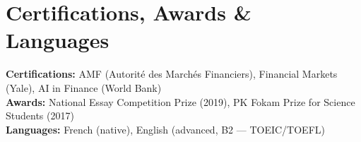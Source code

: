 \section{Certifications, Awards \& Languages}
\begin{itemize}[leftmargin=0.15in, label={}]
  \small{\item{
    \textbf{Certifications:} AMF (Autorit\'e des March\'es Financiers), Financial Markets (Yale), AI in Finance (World Bank) \\
    \textbf{Awards:} National Essay Competition Prize (2019), PK Fokam Prize for Science Students (2017) \\
    \textbf{Languages:} French (native), English (advanced, B2 --- TOEIC/TOEFL)
  }}
\end{itemize}


